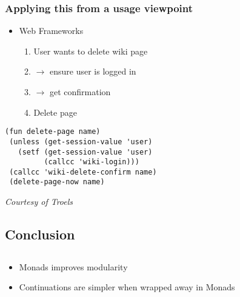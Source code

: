 \documentclass{beamer}
\begin{document}
\begin{frame}[fragile]
\frametitle{Applying this from a usage viewpoint}
\begin{itemize}
\item Web Frameworks
  \begin{enumerate}
  \item User wants to delete wiki page
  \item $\rightarrow$ ensure user is logged in 
  \item $\rightarrow$ get confirmation
  \item Delete page
  \end{enumerate}
\end{itemize}

\lstset{basicstyle=\footnotesize\ttfamily}
\begin{lstlisting}
(fun delete-page name)
 (unless (get-session-value 'user)
   (setf (get-session-value 'user) 
         (callcc 'wiki-login)))
 (callcc 'wiki-delete-confirm name)
 (delete-page-now name)
\end{lstlisting}
\small
\emph{Courtesy of Troels}

\end{frame}



\begin{frame}[fragile]
\section{Conclusion}
\subsection{}
\begin{itemize}
\item Monads improves modularity
\item Continuations are simpler when wrapped away in Monads
\end{itemize}
\end{frame}
\end{document}
